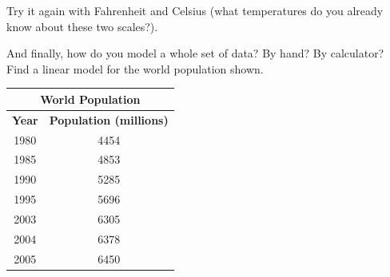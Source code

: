 \documentclass[11pt]{article}
\begin{document}
    \noindent Try it again with Fahrenheit and Celsius (what temperatures do you already know about these two scales?).\\[2ex]

    \newpage

    \noindent And finally, how do you model a whole set of data? By hand? By calculator? Find a linear model for the world population shown.\\[1ex]
    \begin{tabular}{|c|c|}
        \hline
        \multicolumn{2}{|c|}{\textbf{World Population}} \\ \hline
        \textbf{Year} & \textbf{Population (millions)}  \\ \hline
        1980          & 4454                            \\ \hline
        1985          & 4853                            \\ \hline
        1990          & 5285                            \\ \hline
        1995          & 5696                            \\ \hline
        2003          & 6305                            \\ \hline
        2004          & 6378                            \\ \hline
        2005          & 6450                            \\ \hline
    \end{tabular}
\end{document}

